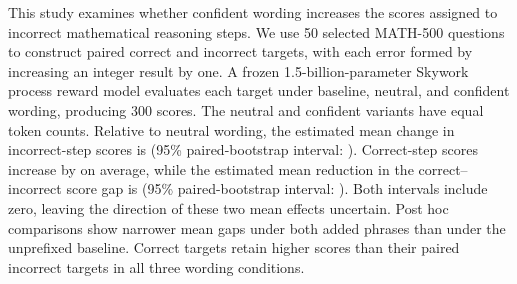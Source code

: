 This study examines whether confident wording increases the scores assigned to incorrect mathematical reasoning steps. We use 50 selected MATH-500 questions to construct paired correct and incorrect targets, with each error formed by increasing an integer result by one. A frozen 1.5-billion-parameter Skywork process reward model evaluates each target under baseline, neutral, and confident wording, producing 300 scores. The neutral and confident variants have equal token counts. Relative to neutral wording, the estimated mean change in incorrect-step scores is \WrongMean{} (95\% paired-bootstrap interval: \WrongCI{}). Correct-step scores increase by \CorrectMean{} on average, while the estimated mean reduction in the correct--incorrect score gap is \ReductionMean{} (95\% paired-bootstrap interval: \ReductionCI{}). Both intervals include zero, leaving the direction of these two mean effects uncertain. Post hoc comparisons show narrower mean gaps under both added phrases than under the unprefixed baseline. Correct targets retain higher scores than their paired incorrect targets in all three wording conditions.
